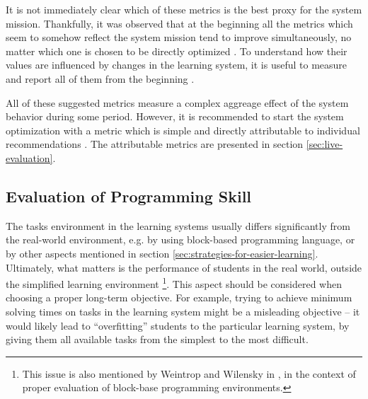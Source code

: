 It is not immediately clear which of these metrics is the best proxy for the system mission.
Thankfully, it was observed that at the beginning all the metrics which seem to somehow
reflect the system mission tend to improve simultaneously, no matter which one
is chosen to be directly optimized \cite[][Rule \#12]{google-ml-rules}.
To understand how their values are influenced by changes in the learning system,
it is useful to measure and report all of them from the beginning
\cite[][Rule \#2]{google-ml-rules}.

All of these suggested metrics measure a complex aggreage effect of the system
behavior during some period.
However, it is recommended to start the system optimization with a metric which is simple
and directly attributable to individual recommendations \cite[][Rule \#12]{google-ml-rules}.
The attributable metrics are presented in section \ref{sec:live-evaluation}.


\subsection{Evaluation of Programming Skill}


The tasks environment in the learning systems usually differs significantly
  from the real-world environment,
  e.g. by using block-based programming language,
  or by other aspects mentioned in section \ref{sec:strategies-for-easier-learning}.
Ultimately, what matters is the performance of students in the real world,
  outside the simplified learning environment%
\footnote{%
  This issue is also mentioned by Weintrop and Wilensky %
  in \cite{challenges-of-blocks-based-environments}, %
  in the context of proper evaluation of block-base programming environments.}.
This aspect should be considered when choosing a proper long-term objective.
For example, trying to achieve minimum solving times on tasks in the learning system
  might be a misleading objective
  -- it would likely lead to ``overfitting'' students to the particular learning system,
  by giving them all available tasks from the simplest to the most difficult.

